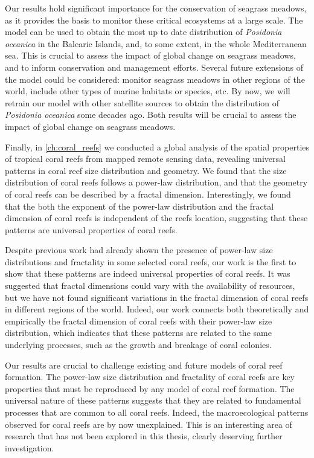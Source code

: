 Our results hold significant importance for the conservation of seagrass
meadows, as it provides the basis to monitor these critical ecosystems at a
large scale. The model can be used to obtain the most up to date distribution
of \textit{Posidonia oceanica} in the Balearic Islands, and, to some extent, in
the whole Mediterranean sea. This is crucial to assess the impact of global
change on seagrass meadows, and to inform conservation and management efforts.
Several future extensions of the model could be considered:
monitor seagrass meadows in other regions of the world, include other types of
marine habitats or species, etc. By now, we will retrain our model with other
satellite sources to obtain the distribution of \textit{Posidonia oceanica}
some decades ago. Both results will be crucial to assess the impact of global
change on seagrass meadows.

Finally, in \cref{ch:coral_reefs} we conducted a global analysis of the spatial
properties of tropical coral reefs from mapped remote sensing data, revealing
universal patterns in coral reef size distribution and geometry. We found that
the size distribution of coral reefs follows a power-law distribution, and that
the geometry of coral reefs can be described by a fractal dimension.
Interestingly, we found that the both the exponent of the power-law
distribution and the fractal dimension of coral reefs is independent of the
reefs location, suggesting that these patterns are universal properties of
coral reefs.

Despite previous work had already shown the presence of power-law size
distributions and fractality in some selected coral reefs, our work is the
first to show that these patterns are indeed universal properties of coral
reefs. It was suggested that fractal dimensions could vary with the
availability of resources, but we have not found significant variations in the
fractal dimension of coral reefs in different regions of the world. Indeed, our
work connects both theoretically and empirically the fractal dimension of coral
reefs with their power-law size distribution, which indicates that these
patterns are related to the same underlying processes, such as the growth and
breakage of coral colonies.

Our results are crucial to challenge existing and future models of coral reef
formation. The power-law size distribution and fractality of coral reefs are
key properties that must be reproduced by any model of coral reef formation.
The universal nature of these patterns suggests that they are related to
fundamental processes that are common to all coral reefs. Indeed, the
macroecological patterns observed for coral reefs are by now unexplained. This
is an interesting area of research that has not been explored in this thesis,
clearly deserving further investigation.